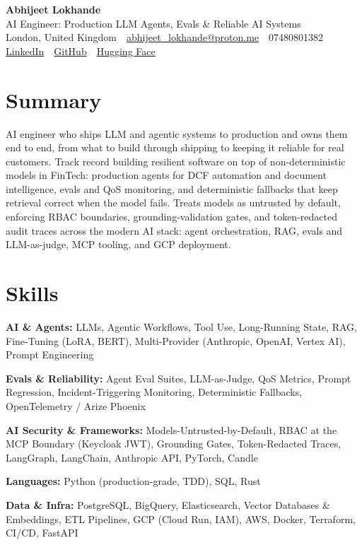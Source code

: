 \documentclass[10pt,a4paper]{article}
\newcommand{\sep}{\,\textcolor{accent!60}{\textbar}\,}
\begin{document}
\begin{center}
  {\fontsize{24}{26}\selectfont\bfseries Abhijeet Lokhande}\\[3pt]
  {\color{accent}\large AI Engineer: Production LLM Agents, Evals \& Reliable AI Systems}\\[5pt]
  {\small
    London, United Kingdom \sep
    \href{mailto:abhijeet_lokhande@proton.me}{abhijeet\_lokhande@proton.me} \sep
    07480801382 \\[2pt]
    \href{https://www.linkedin.com/in/ablds/}{LinkedIn} \sep
    \href{https://github.com/abhijeetscode}{GitHub} \sep
    \href{https://huggingface.co/ab-ai}{Hugging Face}
  }
\end{center}
\vspace{2pt}

\section{Summary}
AI engineer who ships LLM and agentic systems to production and owns them end to end, from what to build through shipping to keeping it reliable for real customers. Track record building resilient software on top of non-deterministic models in FinTech: production agents for DCF automation and document intelligence, evals and QoS monitoring, and deterministic fallbacks that keep retrieval correct when the model fails. Treats models as untrusted by default, enforcing RBAC boundaries, grounding-validation gates, and token-redacted audit traces across the modern AI stack: agent orchestration, RAG, evals and LLM-as-judge, MCP tooling, and GCP deployment.

\section{Skills}
\begin{tight}
  \item[\textcolor{accent}{\small$\bullet$}] \textbf{AI \& Agents:} LLMs, Agentic Workflows, Tool Use, Long-Running State, RAG, Fine-Tuning (LoRA, BERT), Multi-Provider (Anthropic, OpenAI, Vertex AI), Prompt Engineering
  \item[\textcolor{accent}{\small$\bullet$}] \textbf{Evals \& Reliability:} Agent Eval Suites, LLM-as-Judge, QoS Metrics, Prompt Regression, Incident-Triggering Monitoring, Deterministic Fallbacks, OpenTelemetry / Arize Phoenix
  \item[\textcolor{accent}{\small$\bullet$}] \textbf{AI Security \& Frameworks:} Models-Untrusted-by-Default, RBAC at the MCP Boundary (Keycloak JWT), Grounding Gates, Token-Redacted Traces, LangGraph, LangChain, Anthropic API, PyTorch, Candle
  \item[\textcolor{accent}{\small$\bullet$}] \textbf{Languages:} Python (production-grade, TDD), SQL, Rust
  \item[\textcolor{accent}{\small$\bullet$}] \textbf{Data \& Infra:} PostgreSQL, BigQuery, Elasticsearch, Vector Databases \& Embeddings, ETL Pipelines, GCP (Cloud Run, IAM), AWS, Docker, Terraform, CI/CD, FastAPI
\end{tight}
\end{document}
